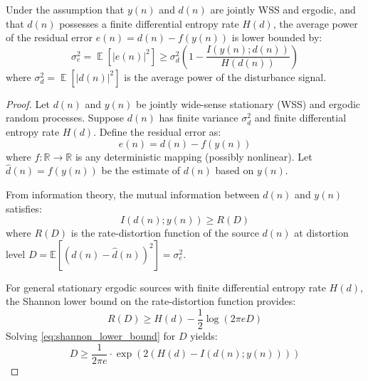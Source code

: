 \documentclass[10pt,a4paper]{amsart}
\DeclareMathOperator{\E}{\mathbb{E}} %
\begin{document}
\begin{lemma}
Under the assumption that \( y(n) \) and \( d(n) \) are jointly WSS and ergodic, and that \( d(n) \) possesses a finite differential entropy rate \( H(d) \), the average power of the residual error \( e(n) = d(n) - f(y(n)) \) is lower bounded by:
\begin{equation}
\sigma_e^2 = \E[|e(n)|^2] \geq \sigma_d^2 \left( 1 - \frac{I(y(n); d(n))}{H(d(n))} \right)
\label{eq:info_bound_raw}
\end{equation}
where \( \sigma_d^2 = \E[|d(n)|^2] \) is the average power of the disturbance signal.
\end{lemma}

\begin{proof}
Let \( d(n) \) and \( y(n) \) be jointly wide-sense stationary (WSS) and ergodic random processes. Suppose \( d(n) \) has finite variance \( \sigma_d^2 \) and finite differential entropy rate \( H(d) \). Define the residual error as:
\[
e(n) = d(n) - f(y(n))
\]
where \( f: \mathbb{R} \to \mathbb{R} \) is any deterministic mapping (possibly nonlinear). Let \( \hat{d}(n) = f(y(n)) \) be the estimate of \( d(n) \) based on \( y(n) \).

From information theory, the mutual information between \( d(n) \) and \( y(n) \) satisfies:
\begin{equation}
I(d(n); y(n)) \geq R(D)
\label{eq:rate_distortion_lower_bound}
\end{equation}
where \( R(D) \) is the rate-distortion function of the source \( d(n) \) at distortion level \( D = \mathbb{E}[(d(n) - \hat{d}(n))^2] = \sigma_e^2 \).

For general stationary ergodic sources with finite differential entropy rate \( H(d) \), the Shannon lower bound on the rate-distortion function provides:
\begin{equation}
R(D) \geq H(d) - \frac{1}{2} \log(2\pi e D)
\label{eq:shannon_lower_bound}
\end{equation}
Solving \eqref{eq:shannon_lower_bound} for \( D \) yields:
\begin{equation}
    D \geq \frac{1}{2\pi e} \cdot \exp\left(2(H(d) - I(d(n); y(n)))\right)
    \label{eq:inequality_exp}
\end{equation}


\end{proof}
\end{document}
